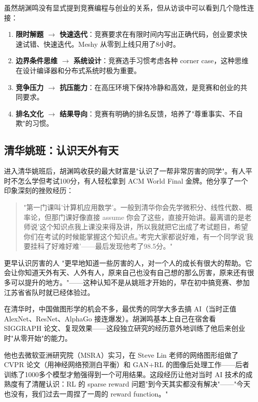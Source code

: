 \documentclass[a4paper]{article}
\begin{document}
虽然胡渊鸣没有显式提到竞赛编程与创业的关系，但从访谈中可以看到几个隐性连接：

\begin{enumerate}
\item \textbf{限时解题 $\rightarrow$ 快速迭代}：竞赛要求在有限时间内写出正确代码，创业要求快速试错、快速迭代。Meshy 从零到上线只用了8小时。
\item \textbf{边界条件思维 $\rightarrow$ 系统设计}：竞赛选手习惯考虑各种 corner case，这种思维在设计编译器和分布式系统时极为重要。
\item \textbf{竞争压力 $\rightarrow$ 抗压能力}：在高压环境下保持冷静和高效，是竞赛和创业的共同要求。
\item \textbf{排名文化 $\rightarrow$ 结果导向}：竞赛有明确的排名反馈，培养了"尊重事实、不自欺"的习惯。
\end{enumerate}

\subsection{清华姚班：认识天外有天}

进入清华姚班后，胡渊鸣收获的最大财富是"认识了一帮非常厉害的同学"。有人平时不怎么学但考试100分，有人轻松拿到 ACM World Final 金牌。他分享了一个印象深刻的挫败经历：

\begin{quote}
"第一门课叫'计算机应用数学'。一般到清华你会先学微积分、线性代数、概率论，但那门课好像直接 assume 你会了这些，直接开始讲。最离谱的是老师说'这个知识点我上课没来得及讲，所以我就把它出成了考试题目，希望你们在考试的时候能掌握这个知识点。'考完大家都说好难，有一个同学说'我要挂科了好难好难'——最后发现他考了98.5分。"
\end{quote}

\begin{importantbox}{更早认识厉害的人}
"更早地知道一些厉害的人，对一个人的成长有很大的帮助。它会让你知道天外有天、人外有人，原来自己也没有自己想的那么厉害，原来还有很多可以提升的地方。"——这种认知不是从姚班才开始的，早在初中搞竞赛、参加江苏省省队时就已经体验过。
\end{importantbox}

在清华时，中国做图形学的机会不多，最优秀的同学大多去搞 AI（当时正值 AlexNet、ResNet、AlphaGo 接连爆发）。胡渊鸣基本上自己在宿舍看 SIGGRAPH 论文、复现效果——这段独立研究的经历意外地训练了他后来创业时"从零开始"的能力。

他也去微软亚洲研究院（MSRA）实习，在 Steve Lin 老师的网络图形组做了 CVPR 论文（用神经网络预测白平衡）和 GAN+RL 的图像后处理工作——后者训练了1000多个模型才勉强得到一个可用结果。这段经历让他对当时 AI 技术的成熟度有了清醒认识：RL 的 sparse reward 问题"到今天其实都没有解决"——"今天也没有，我们过去一周捏了一周的 reward function。"
\end{document}
